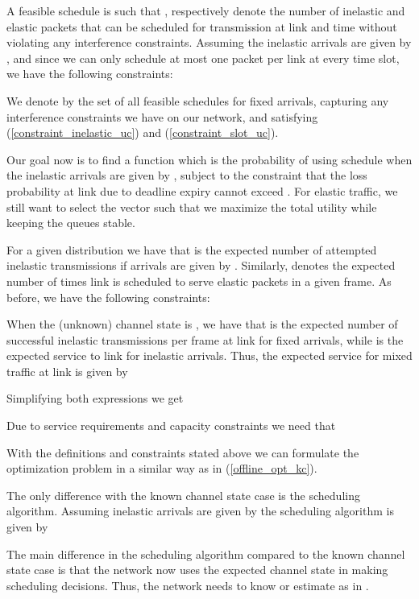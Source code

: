 \documentclass[conference]{IEEEtran}
\begin{document}
A feasible schedule  is such that ,  respectively denote the number of inelastic and elastic packets that can be scheduled for transmission at link  and time  without violating any interference constraints. Assuming the inelastic arrivals are given by , and since we can only schedule at most one packet per link at every time slot, we have the following constraints:


We denote by  the set of all feasible schedules for fixed arrivals, capturing any interference constraints we have on our network, and satisfying (\ref{constraint_inelastic_uc}) and (\ref{constraint_slot_uc}).

Our goal now is to find a function  which is the probability of using schedule  when the inelastic arrivals are given by , subject to the constraint that the loss probability at link  due to deadline expiry cannot exceed . For elastic traffic, we still want to select the vector  such that we maximize the total utility while keeping the queues stable.

For a given distribution  we have that  is the expected number of attempted inelastic transmissions if arrivals are given by . Similarly,  denotes the expected number of times link  is scheduled to serve elastic packets in a given frame. As before, we have the following constraints:





When the (unknown) channel state is , we have that  is the expected number of successful inelastic transmissions per frame at link  for fixed arrivals, while  is the expected service to link  for inelastic arrivals. Thus, the expected service for mixed traffic at link  is given by



Simplifying both expressions we get



Due to service requirements and capacity constraints we need that



With the definitions and constraints stated above we can formulate the optimization problem in a similar way as in (\ref{offline_opt_kc}).

The only difference with the known channel state case is the scheduling algorithm. Assuming inelastic arrivals are given by  the scheduling algorithm is given by


The main difference in the scheduling algorithm compared to the known channel state case is that the network now uses the expected channel state in making scheduling decisions. Thus, the network needs to know or estimate  as in \cite{Hou09a}.
\end{document}
